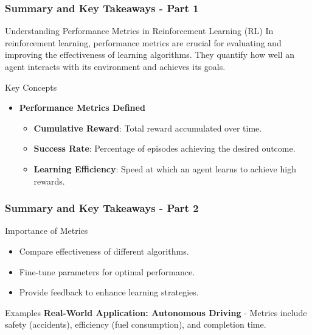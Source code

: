 \documentclass[aspectratio=169]{beamer}
\begin{document}
\begin{frame}[fragile]
    \frametitle{Summary and Key Takeaways - Part 1}
    \begin{block}{Understanding Performance Metrics in Reinforcement Learning (RL)}
        In reinforcement learning, performance metrics are crucial for evaluating and improving the effectiveness of learning algorithms. They quantify how well an agent interacts with its environment and achieves its goals.
    \end{block}
    
    \begin{block}{Key Concepts}
        \begin{itemize}
            \item \textbf{Performance Metrics Defined}
            \begin{itemize}
                \item \textbf{Cumulative Reward}: Total reward accumulated over time.
                \item \textbf{Success Rate}: Percentage of episodes achieving the desired outcome.
                \item \textbf{Learning Efficiency}: Speed at which an agent learns to achieve high rewards.
            \end{itemize}
        \end{itemize}
    \end{block}
\end{frame}

\begin{frame}[fragile]
    \frametitle{Summary and Key Takeaways - Part 2}
    \begin{block}{Importance of Metrics}
        \begin{itemize}
            \item Compare effectiveness of different algorithms.
            \item Fine-tune parameters for optimal performance.
            \item Provide feedback to enhance learning strategies.
        \end{itemize}
    \end{block}
    
    \begin{block}{Examples}
        \textbf{Real-World Application: Autonomous Driving}
        - Metrics include safety (accidents), efficiency (fuel consumption), and completion time.
    \end{block}
\end{frame}
\end{document}
